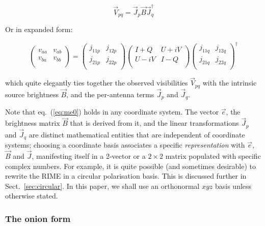 \documentclass[]{aa}
\begin{document}
    \begin{equation}\label{eq:me0}
    \vec V_{pq} = \vec J_p \vec B  \vec J^\dagger_q
    \end{equation}

Or in expanded form:

\[
    \left( 
    \begin{array}{cc}
    v_{aa} & v_{ab} \\
    v_{ba} & v_{bb} \\
    \end{array}
    \right) = 
    \left( 
    \begin{array}{cc}
    j_{11p} & j_{12p} \\
    j_{21p} & j_{22p} \\
    \end{array}
    \right) 
    \left( 
    \begin{array}{cc}
    I+Q & U+iV \\
    U-iV & I-Q \\
    \end{array}
    \right) 
    \left( 
    \begin{array}{cc}
    j_{11q} & j_{12q} \\
    j_{21q} & j_{22q} \\
    \end{array}
    \right)^\dagger
\]

which quite elegantly ties together the observed visibilities $\vec V_{pq}$ with the intrinsic source brightness $\vec B$, and the per-antenna terms $\vec J_p$ and $\vec J_q$.

Note that eq.~(\ref{eq:me0}) holds in any coordinate system. The vector $\vec e$, the brightness matrix $\vec B$ that is derived from it, and the linear transformations $\vec J_p$ and $\vec J_q$ are distinct mathematical entities that are independent of coordinate systems; choosing a coordinate basis associates a specific {\em representation} with $\vec e$,  $\vec B$ and $\vec J$, manifesting itself in a 2-vector or a $2\times2$ matrix populated with specific complex numbers. For example, it is quite possible (and sometimes desirable) to rewrite the RIME in a circular polarisation basis. This is discussed further in Sect.~\ref{sec:circular}. In this paper, we shall use an orthonormal $xyz$ basis unless otherwise stated.

\subsubsection{The onion form}
\end{document}
